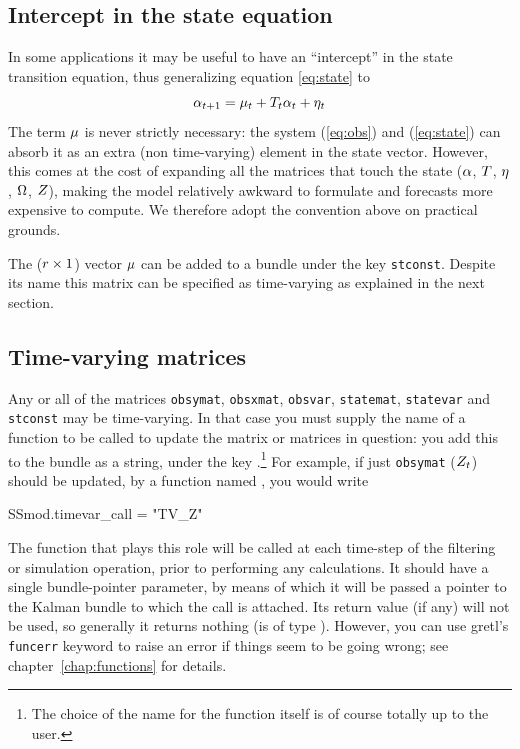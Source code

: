 \subsection{Intercept in the state equation}
\label{sec:stconst}

In some applications it may be useful to have an ``intercept'' in the
state transition equation, thus generalizing equation \eqref{eq:state}
to
\[
  \alpha_{t+1} = \mu_t + T_t \alpha_t + \eta_t \\
\]
The term $\mu$ is never strictly necessary: the system
(\ref{eq:obs}) and (\ref{eq:state}) can absorb it as an extra (non
time-varying) element in the state vector.  However, this comes at the
cost of expanding all the matrices that touch the state ($\alpha$,
$T$, $\eta$, $\Omega$, $Z$), making the model
relatively awkward to formulate and forecasts more expensive to
compute. We therefore adopt the convention above on practical grounds.

The ($r \times 1$) vector $\mu$ can be added to a bundle
under the key \texttt{stconst}. Despite its name this matrix can be
specified as time-varying as explained in the next section.

\subsection{Time-varying matrices}
\label{sec:tvarying}

Any or all of the matrices \texttt{obsymat}, \texttt{obsxmat},
\texttt{obsvar}, \texttt{statemat}, \texttt{statevar} and
\texttt{stconst} may be time-varying.  In that case you must supply
the name of a function to be called to update the matrix or matrices
in question: you add this to the bundle as a string, under the key
.\footnote{The choice of the name for the
  function itself is of course totally up to the user.} For example,
if just \texttt{obsymat} ($Z_t$) should be updated, by a
function named , you would write
%
\begin{code}
SSmod.timevar_call = "TV_Z"
\end{code}
%
The function that plays this role will be called at each time-step of
the filtering or simulation operation, prior to performing any
calculations. It should have a single bundle-pointer parameter, by
means of which it will be passed a pointer to the Kalman bundle to
which the call is attached.  Its return value (if any) will not be
used, so generally it returns nothing (is of type ).
However, you can use gretl's \texttt{funcerr} keyword to raise an
error if things seem to be going wrong; see
chapter~\ref{chap:functions} for details.

